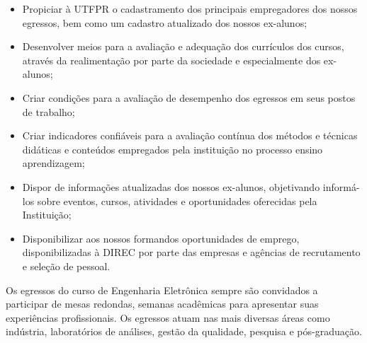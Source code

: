 \begin{itemize}
    \item Propiciar à UTFPR o cadastramento dos principais empregadores dos nossos egressos, bem como um cadastro atualizado dos nossos ex-alunos;
    \item Desenvolver meios para a avaliação e adequação dos currículos dos cursos, através da realimentação por parte da sociedade e especialmente dos ex-alunos;
    \item Criar condições para a avaliação de desempenho dos egressos em seus postos de trabalho;
    \item Criar indicadores confiáveis para a avaliação contínua dos métodos e técnicas didáticas e conteúdos empregados pela instituição no processo ensino aprendizagem;
    \item Dispor de informações atualizadas dos nossos ex-alunos, objetivando informá-los sobre eventos, cursos, atividades e oportunidades oferecidas pela Instituição;
    \item Disponibilizar aos nossos formandos oportunidades de emprego, disponibilizadas à DIREC por parte das empresas e agências de recrutamento e seleção de pessoal.
\end{itemize}    

Os egressos do curso de Engenharia Eletrônica sempre são convidados a participar de mesas redondas, semanas acadêmicas para apresentar suas experiências profissionais. Os egressos atuam nas mais diversas áreas como indústria, laboratórios de análises, gestão da qualidade, pesquisa e pós-graduação.
